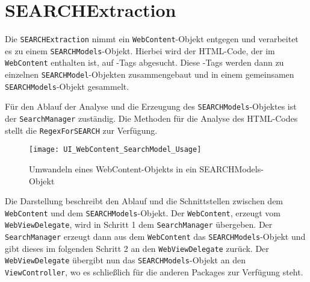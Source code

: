 
\section{SEARCHExtraction}
Die \lstinline|SEARCHExtraction| nimmt ein \lstinline|WebContent|-Objekt entgegen und verarbeitet es zu einem \lstinline|SEARCHModels|-Objekt. Hierbei wird der HTML-Code, der im \lstinline|WebContent| enthalten ist, auf \SEARCH-Tags abgesucht. Diese \SEARCH-Tags werden dann zu einzelnen \lstinline|SEARCHModel|-Objekten zusammengebaut und in einem gemeinsamen \lstinline|SEARCHModels|-Objekt gesammelt.

Für den Ablauf der Analyse und die Erzeugung des \lstinline|SEARCHModels|-Objektes ist der \lstinline|SearchManager| zuständig. Die Methoden für die Analyse des HTML-Codes stellt die \lstinline|RegexForSEARCH| zur Verfügung.

\begin{figure}[h]
	\centering
	\texttt{[image: UI\_WebContent\_SearchModel\_Usage]}
	\caption{Umwandeln eines WebContent-Objekts in ein SEARCHModels-Objekt}
\end{figure}

Die Darstellung beschreibt den Ablauf und die Schnittstellen zwischen dem \lstinline|WebContent| und dem \lstinline|SEARCHModels|-Objekt. Der \lstinline|WebContent|, erzeugt vom \lstinline|WebViewDelegate|, wird in Schritt 1 dem \lstinline|SearchManager| übergeben. Der \lstinline|SearchManager| erzeugt dann aus dem \lstinline|WebContent| das \lstinline|SEARCHModels|-Objekt und gibt dieses im folgenden Schritt 2 an den \lstinline|WebViewDelegate| zurück. Der \lstinline|WebViewDelegate| übergibt nun das \lstinline|SEARCHModels|-Objekt an den \lstinline|ViewController|, wo es schließlich für die anderen Packages zur Verfügung  steht.